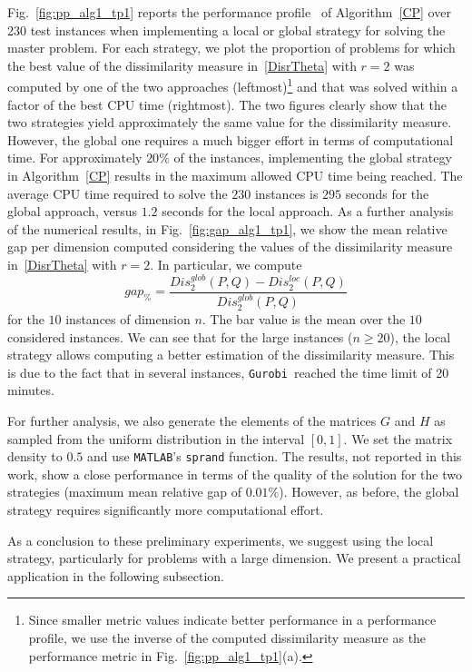 \documentclass[hidelinks,onefignum,onetabnum]{siamart250211}
\theoremstyle{definition}
\theoremstyle{remark}
\newcommand{\gu}{\texttt{Gurobi}}
\newcommand{\matlab}{\texttt{MATLAB}}
\begin{document}
Fig.~\ref{fig:pp_alg1_tp1} reports the performance profile~\cite{DoMo} of Algorithm~\ref{CP} over 230 test instances when implementing a local or global strategy for solving the master problem. For each strategy, we plot the proportion of problems for which the best value of the dissimilarity measure in~\eqref{DisrTheta} with $r=2$ was computed by one of the two approaches (leftmost)\footnote{Since smaller metric values indicate better performance in a performance profile, we use the inverse of the computed dissimilarity measure as the performance metric in Fig.~\ref{fig:pp_alg1_tp1}(a).}
 and that was solved within a factor of the best CPU time (rightmost). The two figures clearly show that the two strategies yield approximately the same value for the dissimilarity measure. However, the global one requires a much bigger effort in terms of computational time. For approximately $20\%$ of the instances, implementing the global strategy in Algorithm~\ref{CP} results in the maximum allowed CPU time being reached. The average CPU time required to solve the $230$ instances is $295$ seconds for the global approach, versus $1.2$ seconds for the local approach.  As a further analysis of the numerical results, in Fig.~\ref{fig:gap_alg1_tp1}, we show the mean relative gap per dimension computed considering the values of the dissimilarity measure in~\eqref{DisrTheta} with $r=2$. In particular, we compute
\begin{equation*}
    gap_{\%} = \frac{Dis^{glob}_2(P,Q) - Dis^{loc}_2(P,Q)}{Dis^{glob}_2(P,Q)}
\end{equation*}
for the $10$ instances of dimension $n$. The bar value is the mean over the $10$ considered instances. We can see that for the large instances ($n \geq 20$), the local strategy allows computing a better estimation of the dissimilarity measure. This is due to the fact that in several instances, \gu~reached the time limit of 20 minutes.


For further analysis, we also generate the elements of the matrices $G$ and $H$ as sampled from the uniform distribution in the interval $[0,1]$. We set the matrix density to $0.5$ and use \matlab's \texttt{sprand} function. The results, not reported in this work, show a close performance in terms of the quality of the solution for the two strategies (maximum mean relative gap of $0.01 \%$). However, as before, the global strategy requires significantly more computational effort. 

As a conclusion to these preliminary experiments, we suggest using the local strategy, particularly for problems with a large dimension. We present a practical application in the following subsection.  
\end{document}
